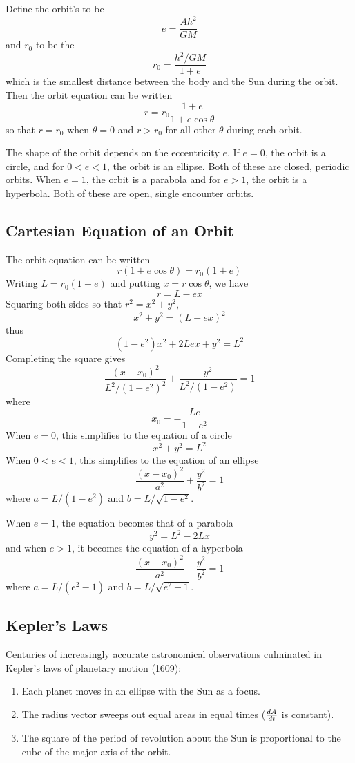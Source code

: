 
Define the orbit's  to be
$$e=\frac{Ah^2}{GM}$$
and $r_0$ to be the 
$$r_0=\frac{h^2/GM}{1+e}$$
which is the smallest distance between the body and the Sun during the
orbit.  Then the orbit equation can be written
$$r=r_0\frac{1+e}{1+e\cos\theta}$$
so that $r=r_0$ when $\theta=0$ and $r>r_0$ for all other $\theta$ during
each orbit.

The shape of the orbit depends on the eccentricity $e$.  If $e=0$, the orbit
is a circle, and for $0<e<1$, the orbit is an ellipse.  Both of these are
closed, periodic orbits.  When $e=1$, the orbit is a parabola and for $e>1$,
the orbit is a hyperbola.  Both of these are open, single encounter orbits.

\subsection{Cartesian Equation of an Orbit}

The orbit equation can be written
$$r(1+e\cos\theta)=r_0(1+e)$$
Writing $L=r_0(1+e)$ and putting $x=r\cos\theta$, we have
$$r=L-ex$$
Squaring both sides so that $r^2=x^2+y^2$,
$$x^2+y^2=(L-ex)^2$$
thus
$$(1-e^2)x^2+2Lex+y^2=L^2$$
Completing the square gives
$$\frac{(x-x_0)^2}{L^2/(1-e^2)^2}+\frac{y^2}{L^2/(1-e^2)}=1$$
where
$$x_0=-\frac{Le}{1-e^2}$$
When $e=0$, this simplifies to the equation of a circle
$$x^2+y^2=L^2$$
When $0<e<1$, this simplifies to the equation of an ellipse
$$\frac{(x-x_0)^2}{a^2}+\frac{y^2}{b^2}=1$$
where $a=L/(1-e^2)$ and $b=L/\sqrt{1-e^2}$.  

When  $e=1$, the equation becomes that of a parabola
$$y^2=L^2-2Lx$$
and when $e>1$, it becomes the equation of a hyperbola
$$\frac{(x-x_0)^2}{a^2}-\frac{y^2}{b^2}=1$$
where $a=L/(e^2-1)$ and $b=L/\sqrt{e^2-1}$.  

\subsection{Kepler's Laws}

Centuries of increasingly accurate astronomical observations culminated in
Kepler's laws of planetary motion (1609):

\begin{enumerate}
\item Each planet moves in an ellipse with the Sun as a focus.
\item The radius vector sweeps out equal areas in equal times 
($\frac{dA}{dt}$ is constant).
\item The square of the period of revolution about the Sun is proportional
to the cube of the major axis of the orbit.
\end{enumerate}

